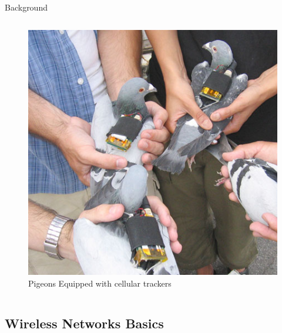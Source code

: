 \documentclass{beamer}
\begin{document}
\begin{frame}{Background}
\begin{columns}
\begin{column}{.5\textwidth}
\begin{figure}[htbp]
          \includegraphics[width=\textwidth]{images/PigeonCellular.jpg}
          \caption{Pigeons Equipped with cellular trackers \cite{Martin_2006}}
          \label{fig:PigeonCellular}
        \end{figure}
      \end{column}
    \end{columns}
\end{frame}

\subsection{Wireless Networks Basics}
\end{document}
